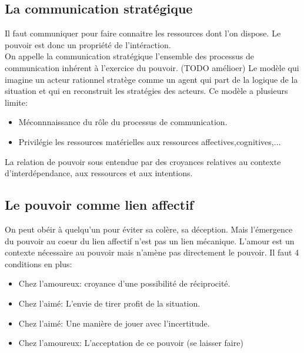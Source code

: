 \documentclass[11pt]{article} %
\begin{document}
	\subsection{La communication stratégique}
		Il faut communiquer pour faire connaitre les ressources dont l'on dispose. Le pouvoir est donc
		un propriété de l'intéraction.\\
		On appelle la communication stratégique l'ensemble des processus de communication inhérent à 
		l'exercice du pouvoir.
		(TODO amélioer) Le modèle qui imagine un acteur rationnel stratège comme un agent qui part de la logique de la 
		 situation et qui en reconstruit les stratégies des acteurs. Ce modèle a plusieurs limite:
		 \begin{itemize}
			\item Méconnnaissance du rôle du processus de communication.
			\item Privilégie les ressources matérielles aux ressources affectives,cognitives,...
		\end{itemize}
		La relation de pouvoir sous entendue par des croyances relatives au contexte d'interdépendance,
		aux ressources et aux intentions.
	\subsection{Le pouvoir comme lien affectif}
		On peut obéir à quelqu'un pour éviter sa colère, sa déception. Mais l'émergence du pouvoir au coeur
		du lien affectif n'est pas un lien mécanique. L'amour est un contexte nécessaire au pouvoir mais 
		n'amène pas directement le pouvoir. Il faut 4 conditions en plus:
		\begin{itemize}
			\item Chez l'amoureux: croyance d'une possibilité de  réciprocité.
			\item Chez l'aimé: L'envie de tirer profit de la situation.
			\item Chez l'aimé: Une manière de jouer avec l'incertitude.
			\item Chez l'amoureux: L'acceptation de ce pouvoir (se laisser faire)
		\end{itemize}
\end{document}
